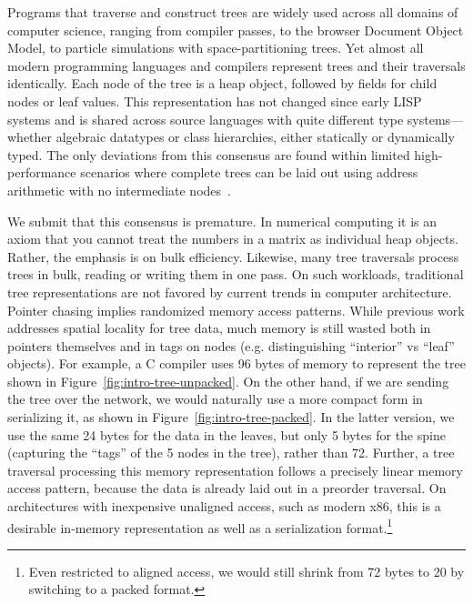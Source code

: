 \documentclass[a4paper,english]{lipics-v2016}
\begin{document}
Programs that traverse and construct trees are widely used across all
domains of computer science, ranging from compiler passes, to the
browser Document Object Model, to particle simulations with
space-partitioning trees.
%
Yet almost all modern programming languages and
compilers represent trees and their traversals identically.
Each node of the tree is a heap object, followed by fields for child nodes or
leaf values.  This representation has not changed since early LISP systems and
is shared across source languages with quite different type
systems---whether algebraic datatypes or class hierarchies, either statically or
dynamically typed.  The only deviations from this consensus are found within
limited high-performance scenarios where complete trees can be laid out using
address arithmetic with no intermediate nodes~\cite{hpc-trees}.

We submit that this consensus is premature.  In numerical computing it is an axiom
that you cannot treat the numbers in a matrix as individual heap objects.
Rather, the emphasis is on bulk efficiency.  Likewise, many tree traversals
process trees in bulk, reading or writing them in one pass.  On such workloads,
traditional tree representations are not favored by current trends in computer
architecture.  Pointer chasing implies randomized memory access patterns.
%
While previous work addresses spatial locality for tree data\cite{Chilimbi1999},
%
much memory is still wasted both in pointers themselves and in tags on nodes
(e.g. distinguishing ``interior'' vs ``leaf'' objects).  For example, a C
compiler uses 96 bytes
%
%
of memory to represent the tree shown in
Figure~\ref{fig:intro-tree-unpacked}. On the other hand, if we are
sending the tree over the network, we would naturally use a more
compact form in serializing it, as shown in
Figure~\ref{fig:intro-tree-packed}.  In the latter version, we use the
same 24 bytes for the data in the leaves, but only 5 bytes for the
spine (capturing the ``tags'' of the 5 nodes in the tree), rather than
72.  Further, a tree traversal processing this memory representation
follows a precisely linear memory access pattern, because the data is
already laid out in a preorder traversal.
%
On architectures with inexpensive unaligned access, such as modern
x86, this is a desirable in-memory representation as well as a
serialization format.\footnote{Even restricted to aligned access, we
  would still shrink from 72 bytes to 20 by switching to a packed
  format.}
\end{document}
